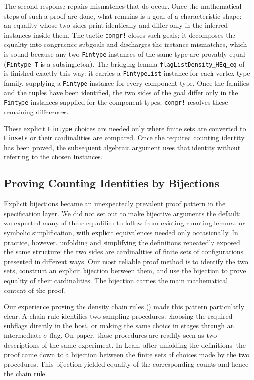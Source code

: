 \documentclass{article}
\newcommand{\lean}[1]{\texttt{#1}}
\begin{document}
The second response repairs mismatches that do occur.  Once the
mathematical steps of such a proof are done, what remains is a goal of a
characteristic shape: an equality whose two sides print identically and
differ only in the inferred instances inside them.  The
tactic \lean{congr!} closes such goals; it decomposes the equality into
congruence subgoals and discharges the instance mismatches, which is sound
because any two \lean{Fintype} instances of the same type are provably
equal (\lean{Fintype T} is a subsingleton).  The bridging lemma
\lean{flagListDensity\allowbreak\_HEq\allowbreak\_eq} of
 is finished exactly this way: it carries
a \lean{FintypeList} instance for each vertex-type family, supplying a
\lean{Fintype} instance for every component type.  Once the families and the
tuples have been identified, the two sides of the goal differ only in the
\lean{Fintype} instances supplied for the component types; \lean{congr!}
resolves these remaining differences.

These explicit \lean{Fintype} choices are needed only where finite sets are
converted to \lean{Finset}s or their cardinalities are compared.  Once the
required counting identity has been proved, the subsequent algebraic argument
uses that identity without referring to the chosen instances.

\subsection{Proving Counting Identities by Bijections}
\label{sec:proof-style}

Explicit bijections became an unexpectedly prevalent proof pattern in the
specification layer.  We did not set out to make bijective arguments the
default: we
expected many of these equalities to follow from existing counting lemmas or
symbolic simplification, with explicit equivalences needed only occasionally.
In practice, however, unfolding and simplifying the definitions repeatedly
exposed the same structure: the two sides are cardinalities of finite sets of
configurations presented in different ways.  Our most reliable proof method
is to identify the two sets, construct an explicit bijection between them, and
use the bijection to prove equality of their cardinalities.  The bijection
carries the main mathematical content of the proof.

Our experience proving the density chain rules () made
this pattern particularly clear.  A chain rule identifies two sampling procedures: choosing the required
subflags directly in the host, or making the same choice in stages through an
intermediate $\sigma$-flag.  On paper, these procedures are readily seen as two
descriptions of the same experiment.  In Lean, after unfolding the
definitions, the proof came down to a bijection between the finite sets of
choices made by the two procedures.  This bijection yielded equality of the
corresponding counts and hence the chain rule.
\end{document}

